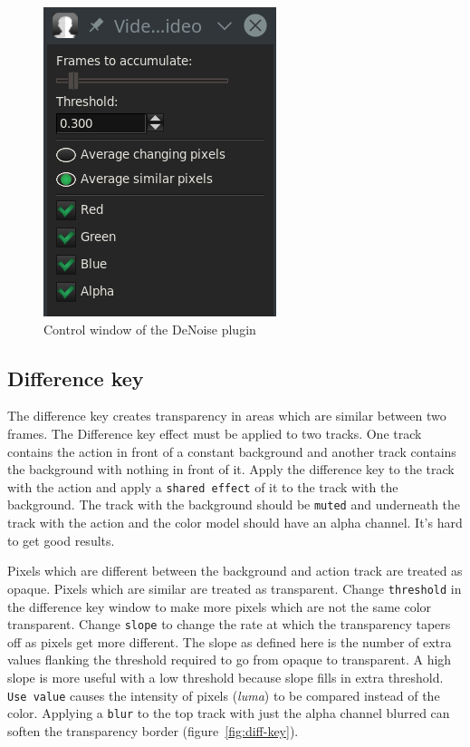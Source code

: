 \begin{figure}[htpb]
    \centering
    \includegraphics[width=0.5\linewidth]{images/denoise.png}
    \caption{Control window of the DeNoise plugin}
    \label{fig:denoise}
\end{figure}

\subsection{Difference key}%
\label{sub:difference_key}

The difference key creates transparency in areas which are similar between two frames. The Difference key effect must be applied to two tracks. One track contains the action in front of a constant background and another track contains the background with nothing in front of it. Apply the difference key to the track with the action and apply a \texttt{shared effect} of it to the track with the background. The track with the background should be \texttt{muted} and underneath the track with the action and the color model should have an alpha channel. It’s hard to get good results.

Pixels which are different between the background and action track are treated as opaque. Pixels which are similar are treated as transparent. Change \texttt{threshold} in the difference key window to make more pixels which are not the same color transparent. Change \texttt{slope} to change the rate at which the transparency tapers off as pixels get more different. The slope as defined here is the number of extra values flanking the threshold required to go from opaque to transparent. A high slope is more useful with a low threshold because slope fills in extra threshold.
\texttt{Use value} causes the intensity of pixels (\textit{luma}) to be compared instead of the color. Applying a \texttt{blur} to the top track with just the alpha channel blurred can soften the transparency border (figure~\ref{fig:diff-key}).

